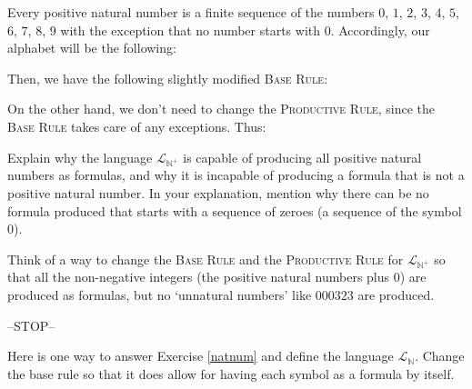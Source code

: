 Every positive natural number is a finite sequence of the numbers $0$, $1$, $2$, $3$, $4$, $5$, $6$, $7$, $8$, $9$ with the exception that no number starts with $0$. Accordingly, our alphabet will be the following:


\noindent Then, we have the following slightly modified \textsc{Base Rule}:


\noindent On the other hand, we don't need to change the \textsc{Productive Rule}, since the \textsc{Base Rule} takes care of any exceptions. Thus: 


\begin{exc}
Explain why the language $\mathcal{L}_{\mathbb{N}^+}$ is capable of producing all positive natural numbers as formulas, and why it is incapable of producing a formula that is not a positive natural number. In your explanation, mention why there can be no formula produced that starts with a sequence of zeroes (a sequence of the symbol $0$).
\end{exc}

\begin{exc}\label{natnum}
Think of a way to change the \textsc{Base Rule} and the \textsc{Productive Rule} for $\mathcal{L}_{\mathbb{N}^+}$ so that all the non-negative integers (the positive natural numbers plus $0$) are produced as formulas, but no `unnatural numbers' like $000323$ are produced. 
\end{exc}

\begin{center}
	--STOP--
\end{center}

\noindent Here is one way to answer Exercise \ref{natnum} and define the language $\mathcal{L}_\mathbb{N}$. Change the base rule so that it does allow for having each symbol as a formula by itself. 


